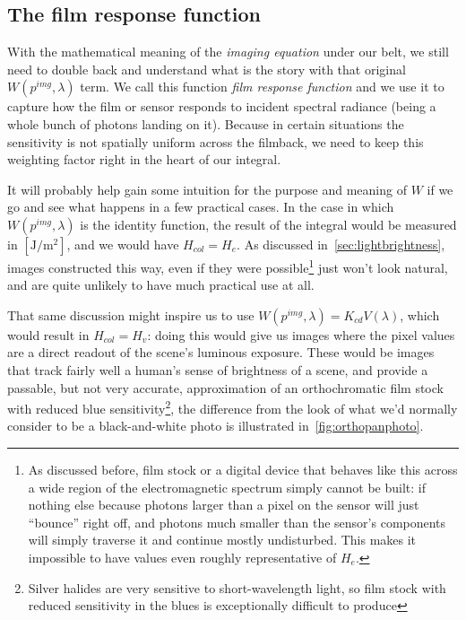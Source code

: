 \subsection{The film response function}\label{sec:filmrespfunc}

With the mathematical meaning of the \textsl{imaging equation} under our belt, 
we still need to double back and understand what is the story with that original $W(p^{img},\lambda)$ term. 
We call this function \textsl{\gls{film response function}} 
and we use it to capture how the film or sensor responds to incident \gls{spectral} \gls{radiance}
(being a whole bunch of photons landing on it). 
Because in certain situations the sensitivity is not spatially uniform across the \gls{filmback}, 
we need to keep this weighting factor right in the heart of our integral.

It will probably help gain some intuition for the purpose and meaning 
of $W$ if we go and see what happens in a few practical cases.
In the case in which $W(p^{img}, \lambda)$ is the identity function, the
result of the integral would be measured in $[\unit{\joule\per\square\meter}]$,
and we would have $H_{col} = H_e$. 
As discussed in~\cref{sec:lightbrightness}, images constructed this way, even 
if they were possible\footnote{
	As discussed before, film stock or a digital device that behaves like this across a wide region
	of the electromagnetic spectrum simply cannot be built: if nothing else because photons
	larger than a pixel on the sensor will just ``bounce'' right off, and photons much smaller
	than the sensor's components will simply traverse it and continue mostly undisturbed.
	This makes it impossible to have values even roughly representative of $H_e$.}  
just won't look natural, and are quite unlikely to have much practical use at all.

That same discussion might inspire us to use $W(p^{img},\lambda) = K_{cd} V(\lambda)$,
which would result in $H_{col} = H_v$: doing this would give us images where the
pixel values are a direct readout of the scene's luminous \gls{exposure}.
These would be images that track fairly well a human's
sense of brightness of a scene, and provide a passable, but not very accurate, approximation of
an orthochromatic film stock with reduced blue sensitivity\footnote{Silver halides
	are very sensitive to short-wavelength light, so film stock with reduced
	sensitivity in the blues is exceptionally difficult to produce}, 
the difference from the look of what we'd normally consider to be a black-and-white
photo is illustrated in~\cref{fig:orthopanphoto}.

